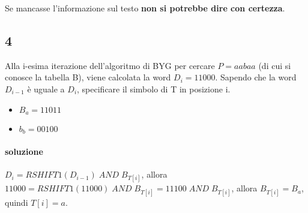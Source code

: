 Se mancasse l'informazione sul testo \textbf{non si potrebbe dire con certezza}.

\subsection{4}

Alla i-esima iterazione dell'algoritmo di BYG per cercare $P = aabaa$ (di cui si conosce la tabella B), viene calcolata la word $D_i = 11000$. Sapendo che la word $D_{i-1}$ \`e uguale a $D_i$, specificare il simbolo di T in posizione i.

\begin{itemize}
    \item $B_a = 11011$
    \item $b_b = 00100$
\end{itemize}

\paragraph{soluzione} $D_i = RSHIFT1(D_{i-1}) \; AND \; B_{T[i]}$, allora $11000 = RSHIFT1(11000) \; AND \; B_{T[i]} = 11100 \; AND \; B_{T[i]}$, allora $B_{T[i]} = B_a$, quindi $T[i] = a$.
